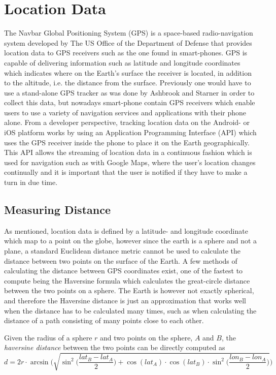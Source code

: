 \section{Location Data}
The Navbar Global Positioning System (GPS) is a space-based radio-navigation system developed by The US Office of the Department of Defense \cite{gps-navstar} that provides location data to GPS receivers such as the one found in smart-phones. GPS is capable of delivering information such as latitude and longitude coordinates which indicates where on the Earth's surface the receiver is located, in addition to the altitude, i.e. the distance from the surface. Previously one would have to use a stand-alone GPS tracker as was done by Ashbrook and Starner \cite{using_gps_to_learn_significant_locations} in order to collect this data, but nowadays smart-phone contain GPS receivers which enable users to use a variety of navigation services and applications with their phone alone. From a developer perspective,  tracking location data on the Android- or iOS platform works by using an Application Programming Interface (API) which uses the GPS receiver inside the phone to place it on the Earth geographically. This API allows the streaming of location data in a continuous fashion which is used for navigation such as with Google Maps, where the user's location changes continually and it is important that the user is notified if they have to make a turn in due time. 

\subsection{Measuring Distance}
As mentioned, location data is defined by a latitude- and longitude coordinate which map to a point on the globe, however since the earth is a sphere and not a plane, a standard Euclidean distance metric cannot be used to calculate the distance between two points on the surface of the Earth. A few methods of calculating the distance between GPS coordinates exist, one of the fastest to compute being the Haversine formula \cite{haversine-formula} which calculates the great-circle distance between the two points on a sphere. The Earth is however not exactly spherical, and therefore the Haversine distance is just an approximation that works well when the distance has to be calculated many times, such as when calculating the distance of a path consisting of many points close to each other.

Given the radius of a sphere $r$ and two points on the sphere, $A$ and $B$, the \textit{haversine distance} between the two points can be directly computed as 
\begin{equation}
\label{eq:haversine}
d = 2r \cdot \arcsin \Bigg( \sqrt{\sin^2 \bigg( \frac{lat_B - lat_A}{2} \bigg) + \cos(lat_A) \cdot \cos(lat_B) \cdot \sin^2 \bigg(\frac{ lon_B - lon_A}{2} \bigg)}\Bigg)
\end{equation}

